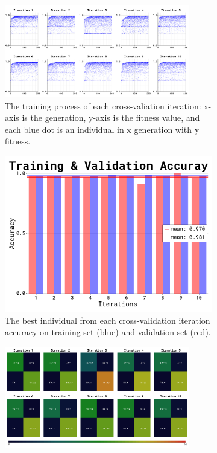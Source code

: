 \documentclass{article}
\begin{document}
\begin{figure}[ht]
    \begin{subfigure}{\textwidth}  
        \centering
        \includegraphics[width=0.89\textwidth]{wdbc-30-15-7-1/train_proc}
        \caption{The training process of each cross-valiation iteration: x-axis is the generation, y-axis is the fitness value, and each blue dot is an individual in x generation with y fitness.}
        \label{fig:4a}
    \end{subfigure}
    \begin{subfigure}{\textwidth}  
        \centering
        \includegraphics[scale=0.25]{wdbc-30-15-7-1/accuracy}
        \caption{The best individual from each cross-validation iteration accuracy on training set (blue) and validation set (red).}
        \label{fig:4b}
    \end{subfigure}
    \begin{subfigure}{\textwidth}   
        \centering
        \includegraphics[width=0.89\textwidth]{wdbc-30-15-7-1/conf_mat}

\end{subfigure}
\end{figure}
\end{document}
